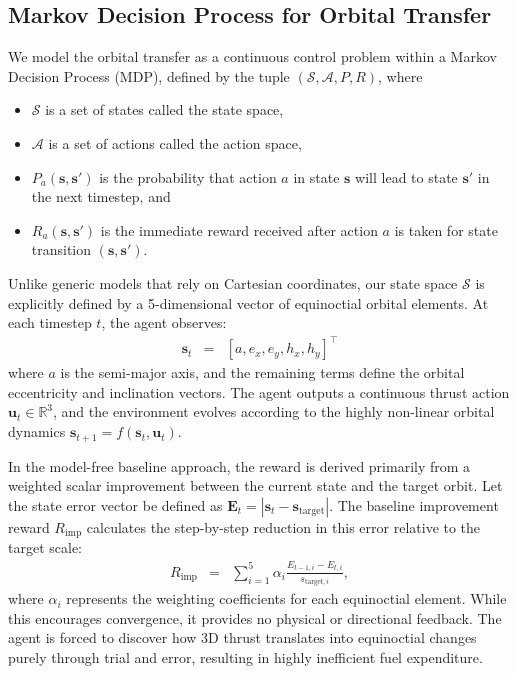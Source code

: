 \documentclass[paper]{ieice}
\begin{document}
\subsection{Markov Decision Process for Orbital Transfer}
We model the orbital transfer as a continuous control problem within a Markov Decision Process (MDP), defined by the tuple $(\mathcal{S}, \mathcal{A}, P, R)$, where
\begin{itemize}
    \item $\mathcal{S}$ is a set of states called the state space,

    \item $\mathcal{A}$ is a set of actions called the action space,

    \item $P_a (\mathbf{s}, \mathbf{s}')$ is the probability that action $a$ in state $\mathbf{s}$ will lead to state $\mathbf{s}'$ in the next timestep, and

    \item $R_a (\mathbf{s}, \mathbf{s}')$ is the immediate reward received after action $a$ is taken for state transition $(\mathbf{s}, \mathbf{s}')$.
\end{itemize}
Unlike generic models that rely on Cartesian coordinates, our state space $\mathcal{S}$ is explicitly defined by a 5-dimensional vector of equinoctial orbital elements. At each timestep $t$, the agent observes:
\begin{eqnarray}
    \mathbf{s}_t
    & = &
    [a, e_x, e_y, h_x, h_y]^\top
\end{eqnarray}
where $a$ is the semi-major axis, and the remaining terms define the orbital eccentricity and inclination vectors. The agent outputs a continuous thrust action $\mathbf{u}_t \in \mathbb{R}^3$, and the environment evolves according to the highly non-linear orbital dynamics $\mathbf{s}_{t+1} = f(\mathbf{s}_t, \mathbf{u}_t)$.

In the model-free baseline approach, the reward is derived primarily from a weighted scalar improvement between the current state and the target orbit. Let the state error vector be defined as $\mathbf{E}_t = |\mathbf{s}_t - \mathbf{s}_{\mathrm{target}}|$. The baseline improvement reward $R_{\mathrm{imp}}$ calculates the step-by-step reduction in this error relative to the target scale:
\begin{eqnarray}
    R_{\mathrm{imp}}
    & = &
    \sum_{i=1}^{5} \alpha_i \frac{E_{t-1, i} - E_{t, i}}{s_{\mathrm{target}, i}},
\end{eqnarray}
where $\alpha_i$ represents the weighting coefficients for each equinoctial element. While this encourages convergence, it provides no physical or directional feedback. The agent is forced to discover how 3D thrust translates into equinoctial changes purely through trial and error, resulting in highly inefficient fuel expenditure.
\end{document}
